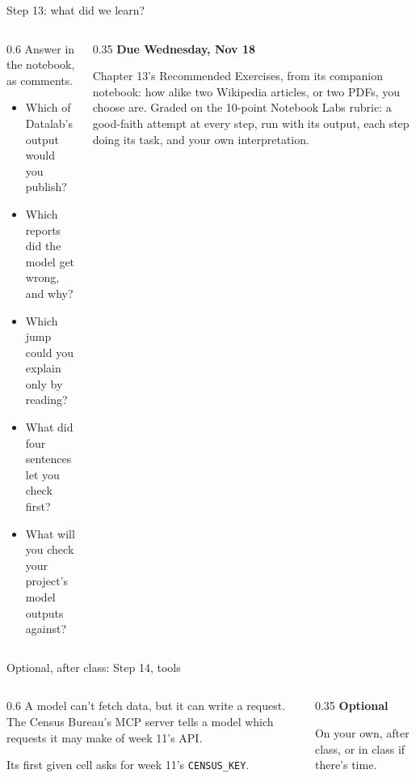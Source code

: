 \documentclass[9pt,aspectratio=169]{beamer}
\begin{document}
\begin{frame}{Step 13: what did we learn?}
    \begin{columns}[T]
        \begin{column}{0.6\textwidth}
            Answer in the notebook, as comments.
            \begin{itemize}\small
                \item Which of Datalab's output would you publish?
                \item Which reports did the model get wrong, and why?
                \item Which jump could you explain only by reading?
                \item What did four sentences let you check first?
                \item What will you check your project's model outputs against?
            \end{itemize}
        \end{column}
        \begin{column}{0.35\textwidth}
            \textbf{Due Wednesday, Nov 18}\\[2pt]
            {\footnotesize Chapter 13's Recommended Exercises, from its companion notebook: how alike two Wikipedia articles, or two PDFs, you choose are. Graded on the 10-point Notebook Labs rubric: a good-faith attempt at every step, run with its output, each step doing its task, and your own interpretation.\par}
        \end{column}
    \end{columns}
\end{frame}

\begin{frame}{Optional, after class: Step 14, tools}
    \begin{columns}[T]
        \begin{column}{0.6\textwidth}
            A model can't fetch data, but it can write a request. The Census Bureau's MCP server tells a model which requests it may make of week 11's API.

            \medskip
            Its first given cell asks for week 11's \texttt{CENSUS\_KEY}.
        \end{column}
        \begin{column}{0.35\textwidth}
            \textbf{Optional}\\[2pt]
            {\footnotesize On your own, after class, or in class if there's time.\par}
        \end{column}
    \end{columns}
\end{frame}
\end{document}
